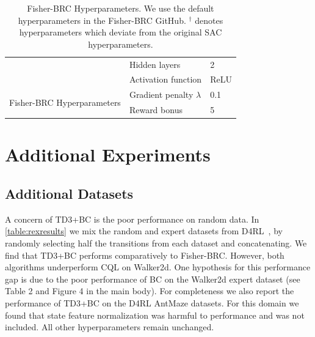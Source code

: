\documentclass{article}
\begin{document}
\begin{table}
\begin{tabular}{cll}
                                      & Hidden layers           & 2         \\
                                      & Activation function & ReLU \\
\midrule
\multirow{2}{*}{Fisher-BRC Hyperparameters}  & Gradient penalty $\lambda$             & 0.1      \\
& Reward bonus & 5 \\
\bottomrule
\end{tabular}
\vspace{6pt}
\caption{Fisher-BRC Hyperparameters. We use the default hyperparameters in the Fisher-BRC GitHub. $^\dagger$ denotes hyperparameters which deviate from the original SAC hyperparameters.}\label{table:fisher_hyp}
\end{table}

\clearpage

\section{Additional Experiments}

\subsection{Additional Datasets}

A concern of TD3+BC is the poor performance on random data. In \autoref{table:rexresults} we mix the random and expert datasets from D4RL~\citep{fu2021benchmarks}, by randomly selecting half the transitions from each dataset and concatenating. We find that TD3+BC performs comparatively to Fisher-BRC. However, both algorithms underperform CQL on Walker2d. One hypothesis for this performance gap is due to the poor performance of BC on the Walker2d expert dataset (see Table 2 and Figure 4 in the main body). For completeness we also report the performance of TD3+BC on the D4RL AntMaze datasets. For this domain we found that state feature normalization was harmful to performance and was not included. All other hyperparameters remain unchanged. 
\end{document}
